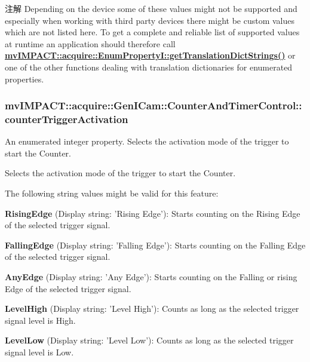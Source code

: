 \begin{DoxyNote}{注解}
Depending on the device some of these values might not be supported and especially when working with third party devices there might be custom values which are not listed here. To get a complete and reliable list of supported values at runtime an application should therefore call {\bfseries \hyperlink{classmv_i_m_p_a_c_t_1_1acquire_1_1_enum_property_i_a0ba6ccbf5ee69784d5d0b537924d26b6}{mv\+I\+M\+P\+A\+C\+T\+::acquire\+::\+Enum\+Property\+I\+::get\+Translation\+Dict\+Strings()}} or one of the other functions dealing with translation dictionaries for enumerated properties. 
\end{DoxyNote}
\hypertarget{classmv_i_m_p_a_c_t_1_1acquire_1_1_gen_i_cam_1_1_counter_and_timer_control_ae3e718076d7c1392e360281172930b4c}{
\subsubsection[{counter\+Trigger\+Activation}]{ mv\+I\+M\+P\+A\+C\+T\+::acquire\+::\+Gen\+I\+Cam\+::\+Counter\+And\+Timer\+Control\+::counter\+Trigger\+Activation}}\label{classmv_i_m_p_a_c_t_1_1acquire_1_1_gen_i_cam_1_1_counter_and_timer_control_ae3e718076d7c1392e360281172930b4c}


An enumerated integer property. Selects the activation mode of the trigger to start the Counter. 

Selects the activation mode of the trigger to start the Counter.

The following string values might be valid for this feature\+:
\begin{DoxyItemize}
\item {\bfseries Rising\+Edge} (Display string\+: 'Rising Edge')\+: Starts counting on the Rising Edge of the selected trigger signal.
\item {\bfseries Falling\+Edge} (Display string\+: 'Falling Edge')\+: Starts counting on the Falling Edge of the selected trigger signal.
\item {\bfseries Any\+Edge} (Display string\+: 'Any Edge')\+: Starts counting on the Falling or rising Edge of the selected trigger signal.
\item {\bfseries Level\+High} (Display string\+: 'Level High')\+: Counts as long as the selected trigger signal level is High.
\item {\bfseries Level\+Low} (Display string\+: 'Level Low')\+: Counts as long as the selected trigger signal level is Low.
\end{DoxyItemize}

